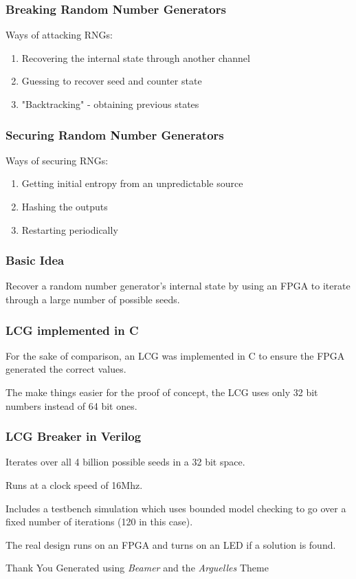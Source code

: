 \documentclass{beamer}
\begin{document}
  \begin{frame}
    \frametitle{Breaking Random Number Generators}

    Ways of attacking RNGs:
    \begin{enumerate}
        \item Recovering the internal state through another channel
        \item Guessing to recover seed and counter state
        \item "Backtracking" - obtaining previous states
    \end{enumerate}
    
  \end{frame}
  
  \begin{frame}
    \frametitle{Securing Random Number Generators}

    Ways of securing RNGs:
    \begin{enumerate}
        \item Getting initial entropy from an unpredictable source
        \item Hashing the outputs
        \item Restarting periodically
    \end{enumerate}
    
  \end{frame}


  \begin{frame}
    \frametitle{Basic Idea}

    Recover a random number generator's internal state
    by using an FPGA to iterate through a large number of possible seeds.
  \end{frame}

  \begin{frame}
    \frametitle{LCG implemented in C}

    For the sake of comparison, an LCG was implemented in C
    to ensure the FPGA generated the correct values.    

    \vfill

    The make things easier for the proof of concept,
    the LCG uses only 32 bit numbers instead of 64 bit ones.
  \end{frame}

  \begin{frame}
    \frametitle{LCG Breaker in Verilog}

    Iterates over all 4 billion possible seeds in a 32 bit space.

    Runs at a clock speed of 16Mhz.

    \vfill

    Includes a testbench simulation which uses bounded model
    checking to go over a fixed number of iterations (120 in this case).

    \vfill

    The real design runs on an FPGA and turns on an LED if
    a solution is found.

    
  \end{frame}
   
  \ThankYou
  \begin{frame}
    \AlegreyaSansExtraBold Thank You
    \AlegreyaSansLight \vfill{Generated using \textit{Beamer} and the \textit{Arguelles} Theme}
  \end{frame}
\end{document}
